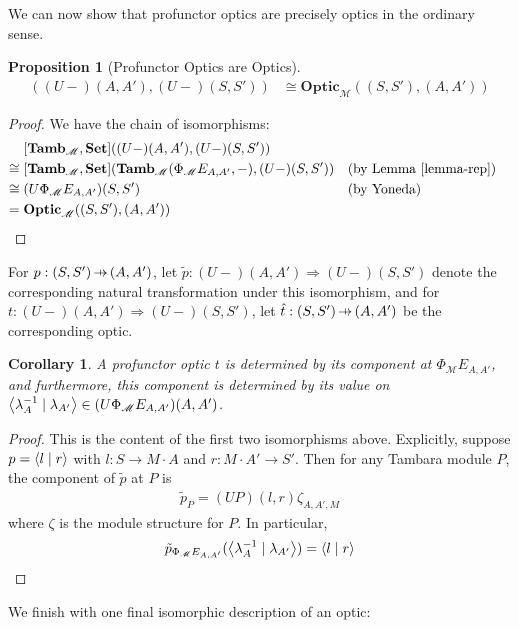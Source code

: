 \documentclass[11pt,letterpaper]{article}
\theoremstyle{plain}
\newtheorem{proposition}[theorem]{Proposition}
\newtheorem{corollary}[theorem]{Corollary}
\theoremstyle{definition}
\newcommand{\M}{\mathscr{M}}
\newcommand{\Pastro}{\Phi}
\newcommand{\Set}{\mathbf{Set}}
\newcommand{\Tamb}{\mathbf{Tamb}}
\newcommand{\Optic}{\mathbf{Optic}}
\newcommand{\act}{\cdot}
\newcommand{\rep}[2]{{\ensuremath \left\langle #1 \mid #2 \right\rangle}}
\newcommand{\hto}{\ensuremath{\,\mathaccent\shortmid\rightarrow\,}}
\begin{document}
We can now show that profunctor optics are precisely optics in the ordinary sense.

\begin{proposition}[Profunctor Optics are Optics]\label{prop:profunctor-optics-are-optics}
  \begin{align*}
    [\Tamb_\M, \Set]((U-)(A,A'),(U-)(S,S')) &\cong \Optic_\M((S, S'), (A, A'))
  \end{align*}
\end{proposition}
\begin{proof}
  We have the chain of isomorphisms:
  \begin{align*}
    &[\Tamb_\M, \Set]((U-)(A,A'),(U-)(S,S')) \\
    \cong \;&[\Tamb_\M, \Set](\Tamb_\M(\Pastro_\M E_{A, A'}, -), (U-)(S,S'))  && \text{(by Lemma~\ref{lemma-rep})}\\
    \cong \;&(U\Pastro_\M E_{A, A'})(S,S')  && \text{(by Yoneda)} \\
    = \;&\Optic_\M((S, S'), (A, A'))
  \end{align*}
\end{proof}

For $p : (S, S') \hto (A, A')$, let $\tilde{p} : (U-)(A,A') \Rightarrow (U-)(S,S')$ denote the corresponding natural transformation under this isomorphism, and for $t : (U-)(A,A') \Rightarrow (U-)(S,S')$, let $\hat{t} : (S, S') \hto (A, A')$ be the corresponding optic.

\begin{corollary}
  A profunctor optic $t$ is determined by its component at $\Pastro_\M E_{A, A'}$, and furthermore, this component is determined by its value on $\rep{\lambda_A^{-1}}{\lambda_{A'}} \in (U \Pastro_\M E_{A, A'})(A, A')$.
\end{corollary}
\begin{proof}
  This is the content of the first two isomorphisms above. Explicitly, suppose $p = \rep{l}{r}$ with $l : S \to M\act A$ and $r : M\act A' \to S'$. Then for any Tambara module $P$, the component of $\tilde{p}$ at $P$ is
  \begin{align*}
    \tilde{p}_P = (UP)(l,r) \zeta_{A,A',M}
  \end{align*}
  where $\zeta$ is the module structure for $P$. In particular,
  \[
    \tilde{p}_{\Pastro_\M E_{A, A'}}(\rep{\lambda_A^{-1}}{\lambda_{A'}}) = \rep{l}{r}
  \]
\end{proof}

We finish with one final isomorphic description of an optic:
\end{document}
